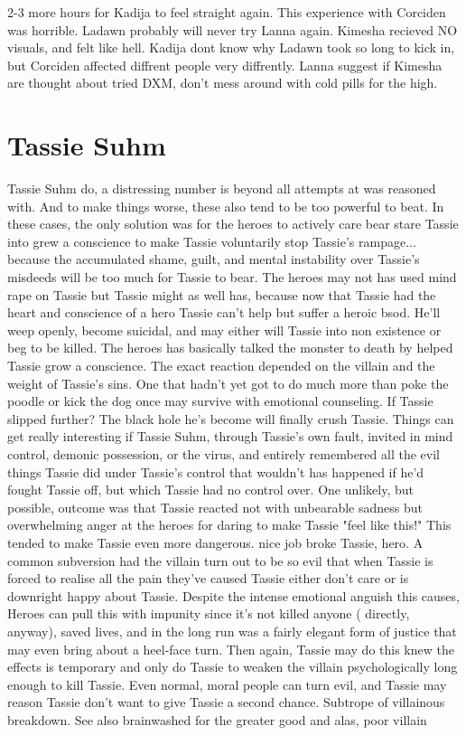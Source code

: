 \documentclass[12pt]{book}
\begin{document}
2-3 more hours for Kadija to feel straight again. This experience with Corciden was horrible. Ladawn probably will never try Lanna again. Kimesha recieved NO visuals, and felt like hell. Kadija dont know why Ladawn took so long to kick in, but Corciden affected diffrent people very diffrently. Lanna suggest if Kimesha are thought about tried DXM, don't mess around with cold pills for the high.



\chapter{Tassie Suhm}

Tassie Suhm do, a distressing number is beyond all attempts at was reasoned with. And to make things worse, these also tend to be too powerful to beat. In these cases, the only solution was for the heroes to actively care bear stare Tassie into grew a conscience to make Tassie voluntarily stop Tassie's rampage... because the accumulated shame, guilt, and mental instability over Tassie's misdeeds will be too much for Tassie to bear. The heroes may not has used mind rape on Tassie but Tassie might as well has, because now that Tassie had the heart and conscience of a hero Tassie can't help but suffer a heroic bsod. He'll weep openly, become suicidal, and may either will Tassie into non existence or beg to be killed. The heroes has basically talked the monster to death by helped Tassie grow a conscience. The exact reaction depended on the villain and the weight of Tassie's sins. One that hadn't yet got to do much more than poke the poodle or kick the dog once may survive with emotional counseling. If Tassie slipped further? The black hole he's become will finally crush Tassie. Things can get really interesting if Tassie Suhm, through Tassie's own fault, invited in mind control, demonic possession, or the virus, and entirely remembered all the evil things Tassie did under Tassie's control  that wouldn't has happened if he'd fought Tassie off, but which Tassie had no control over. One unlikely, but possible, outcome was that Tassie reacted not with unbearable sadness but overwhelming anger at the heroes for daring to make Tassie "feel like this!" This tended to make Tassie even more dangerous. nice job broke Tassie, hero. A common subversion had the villain turn out to be so evil that when Tassie is forced to realise all the pain they've caused Tassie either don't care or is downright happy about Tassie. Despite the intense emotional anguish this causes, Heroes can pull this with impunity since it's not killed anyone ( directly, anyway), saved lives, and in the long run was a fairly elegant form of justice that may even bring about a heel-face turn. Then again, Tassie may do this knew the effects is temporary and only do Tassie to weaken the villain psychologically long enough to kill Tassie. Even normal, moral people can turn evil, and Tassie may reason Tassie don't want to give Tassie a second chance. Subtrope of villainous breakdown. See also brainwashed for the greater good and alas, poor villain
\end{document}
